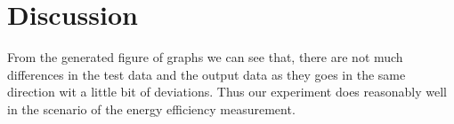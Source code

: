 \section{Discussion}
\label{sect:discussion}
From the generated figure of graphs we can see that, there are not much differences in the test data and the output data as they goes in the same direction wit a little bit of deviations. Thus our experiment does reasonably well in the scenario of the energy efficiency measurement. 